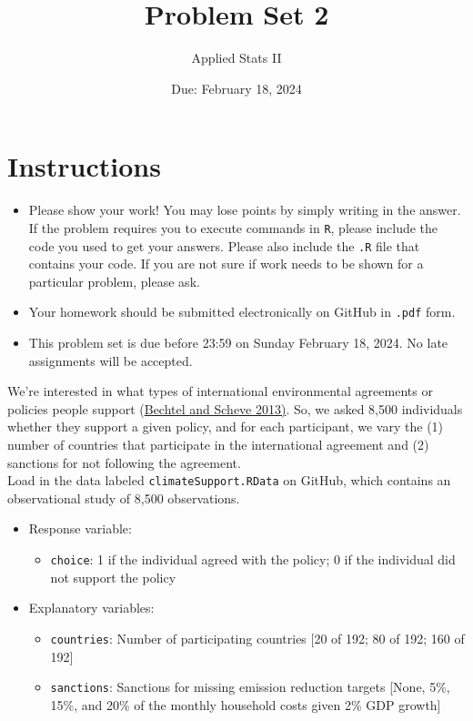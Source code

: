 \documentclass[12pt,letterpaper]{article}
\title{Problem Set 2}
\date{Due: February 18, 2024}
\author{Applied Stats II}
\begin{document}
	\maketitle
	\section*{Instructions}
	\begin{itemize}
		\item Please show your work! You may lose points by simply writing in the answer. If the problem requires you to execute commands in \texttt{R}, please include the code you used to get your answers. Please also include the \texttt{.R} file that contains your code. If you are not sure if work needs to be shown for a particular problem, please ask.
		\item Your homework should be submitted electronically on GitHub in \texttt{.pdf} form.
		\item This problem set is due before 23:59 on Sunday February 18, 2024. No late assignments will be accepted.
	\end{itemize}

	
\noindent We're interested in what types of international environmental agreements or policies people support (\href{https://www.pnas.org/content/110/34/13763}{Bechtel and Scheve 2013)}. So, we asked 8,500 individuals whether they support a given policy, and for each participant, we vary the (1) number of countries that participate in the international agreement and (2) sanctions for not following the agreement. \\

\noindent Load in the data labeled \texttt{climateSupport.RData} on GitHub, which contains an observational study of 8,500 observations.

\begin{itemize}
	\item
	Response variable: 
	\begin{itemize}
		\item \texttt{choice}: 1 if the individual agreed with the policy; 0 if the individual did not support the policy
	\end{itemize}
	\item
	Explanatory variables: 
	\begin{itemize}
		\item
		\texttt{countries}: Number of participating countries [20 of 192; 80 of 192; 160 of 192]
		\item
		\texttt{sanctions}: Sanctions for missing emission reduction targets [None, 5\%, 15\%, and 20\% of the monthly household costs given 2\% GDP growth]
		
	\end{itemize}
	
\end{itemize}
\end{document}
